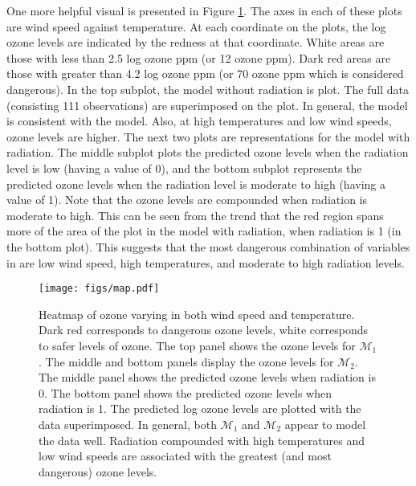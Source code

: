 \documentclass{../../tex_template/asaproc}
\newcommand{\M}{\mathcal{M}}
\begin{document}
One more helpful visual is presented in Figure \ref{fig:map}.  The axes in each
of these plots are wind speed against temperature. At each coordinate on the
plots, the log ozone levels are indicated by the redness at that coordinate.
White areas are those with less than 2.5 log ozone ppm (or 12 ozone ppm).  Dark
red areas are those with greater than 4.2 log ozone ppm (or 70 ozone ppm which
is considered dangerous). In the top subplot, the model without radiation is plot.
The full data (consisting 111 observations) are superimposed on the plot.
In general, the model is consistent with the model. Also, at high temperatures
and low wind speeds, ozone levels are higher. The next two plots are representations
for the model with radiation. The middle subplot plots the predicted ozone levels
when the radiation level is low (having a value of 0), and the
bottom subplot represents the predicted ozone levels when the radiation level is 
moderate to high (having a value of 1). Note that the ozone levels are compounded
when radiation is moderate to high. This can be seen from the trend that
the red region spans more of the area of the plot in the model with radiation,
when radiation is 1 (in the bottom plot). This suggests that the most dangerous
combination of variables in are low wind speed, high temperatures, and moderate
to high radiation levels.

\begin{figure}[H]
  \texttt{[image: figs/map.pdf]}
  \caption{\small Heatmap of ozone varying in both wind speed and temperature. 
    Dark red corresponds to dangerous ozone levels, white corresponds to safer
    levels of ozone.  The top panel shows the ozone levels for $\M_1$. The
    middle and bottom panels display the ozone levels for $\M_2$. The middle
    panel shows the predicted ozone levels when radiation is 0. The bottom
    panel shows the predicted ozone levels when radiation is 1. The predicted
    log ozone levels are plotted with the data superimposed.  In general, both
    $\M_1$ and $\M_2$ appear to model the data well. Radiation compounded with
    high temperatures and low wind speeds are associated with the greatest
    (and most dangerous) ozone levels.}
  \label{fig:map}
\end{figure}

\end{document}
